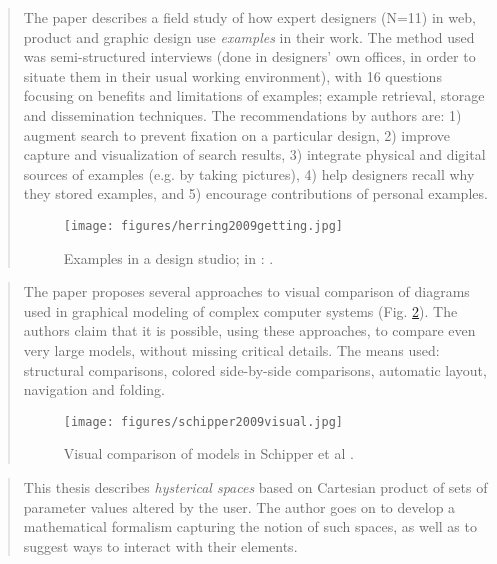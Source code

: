 
		\begin{quote}
		\small
		The paper describes a field study of how expert designers (N=11) in web,
		product and graphic design use {\em examples} in their work.
		The method used was semi-structured interviews (done in designers' own offices,
		in order to situate them in their usual working environment), with 16 questions focusing
		on benefits and limitations of examples; example retrieval, storage and 
		dissemination techniques. The recommendations by authors are: 
		1) augment search to prevent fixation on a particular design,
		2) improve capture and visualization of search results, 
		3) integrate physical and digital sources of examples (e.g. by taking pictures),
		4) help designers recall why they stored examples, and
		5) encourage contributions of personal examples.		
		\begin{figure}[htb]
		\begin{center}
		\texttt{[image: figures/herring2009getting.jpg]}
		\caption{Examples in a design studio; 
		in \citeauthor{herring2009getting}:  \cite{herring2009getting}.}
		\label{fig:herring2009getting}
		\end{center}
		\end{figure}
		\end{quote}

		\begin{quote}
		\small
		The paper proposes several approaches to visual comparison of diagrams used in graphical modeling
		of complex computer systems (Fig. \ref{fig:schipper2009visual}). 
		The authors claim that it is possible, using these approaches, to compare even very large models, 
		without missing critical details. The means used: 
		structural comparisons,
		colored side-by-side comparisons,
		automatic layout,
		navigation and 
		folding.
		\begin{figure}[htb]
		\begin{center}
		\texttt{[image: figures/schipper2009visual.jpg]}
		\caption{Visual comparison of models in Schipper et al \cite{schipper2009visual}.}
		\label{fig:schipper2009visual}
		\end{center}
		\end{figure}				
		\end{quote}

		\begin{quote}
		\small
		This thesis describes {\em hysterical spaces} based on 
		Cartesian product of sets of parameter values altered by the user.
		The author goes on to develop a mathematical formalism capturing the notion
		of such spaces, as well as to suggest ways to interact with their elements. 
		\end{quote}

